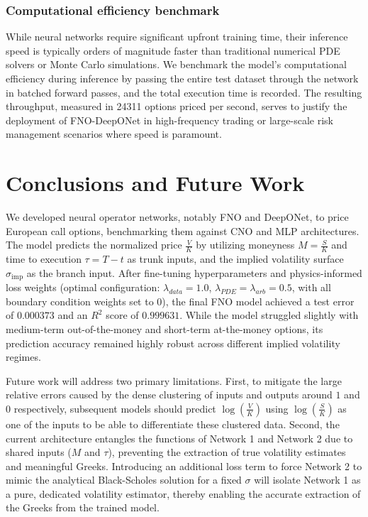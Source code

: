\documentclass[a4paper,fleqn]{cas-sc}
\begin{document}
\subsubsection{Computational efficiency benchmark}
While neural networks require significant upfront training time, their inference speed is typically orders of magnitude faster than traditional numerical PDE solvers or Monte Carlo simulations. We benchmark the model's computational efficiency during inference by passing the entire test dataset through the network in batched forward passes, and the total execution time is recorded. The resulting throughput, measured in 24311 options priced per second, serves to justify the deployment of FNO-DeepONet in high-frequency trading or large-scale risk management scenarios where speed is paramount.


\vspace{-10pt}\section{Conclusions and Future Work}
We developed neural operator networks, notably FNO and DeepONet, to price European call options, benchmarking them against CNO and MLP architectures. The model predicts the normalized price $\frac{V}{K}$ by utilizing moneyness $M=\frac{S}{K}$ and time to execution $\tau=T-t$ as trunk inputs, and the implied volatility surface $\sigma_{\text{imp}}$ as the branch input. After fine-tuning hyperparameters and physics-informed loss weights (optimal configuration: $\lambda_{data}=1.0$, $\lambda_{PDE}=\lambda_{arb}=0.5$, with all boundary condition weights set to $0$), the final FNO model achieved a test error of $0.000373$ and an $R^2$ score of $0.999631$. While the model struggled slightly with medium-term out-of-the-money and short-term at-the-money options, its prediction accuracy remained highly robust across different implied volatility regimes.

Future work will address two primary limitations. First, to mitigate the large relative errors caused by the dense clustering of inputs and outputs around $1$ and $0$ respectively, subsequent models should predict $\log(\frac{V}{K})$ using $\log(\frac{S}{K})$ as one of the inputs to be able to differentiate these clustered data. Second, the current architecture entangles the functions of Network 1 and Network 2 due to shared inputs ($M$ and $\tau$), preventing the extraction of true volatility estimates and meaningful Greeks. Introducing an additional loss term to force Network 2 to mimic the analytical Black-Scholes solution for a fixed $\sigma$ will isolate Network 1 as a pure, dedicated volatility estimator, thereby enabling the accurate extraction of the Greeks from the trained model.
\end{document}
